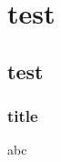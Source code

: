 \documentclass{beamer}
\begin{document}
\begin{frame}
\tableofcontents[subsubsectionstyle=hide]
\end{frame}

\section{test}
\subsection{test}
\subsubsection{title}
\begin{frame}
    abc
\end{frame} 
\end{document}
